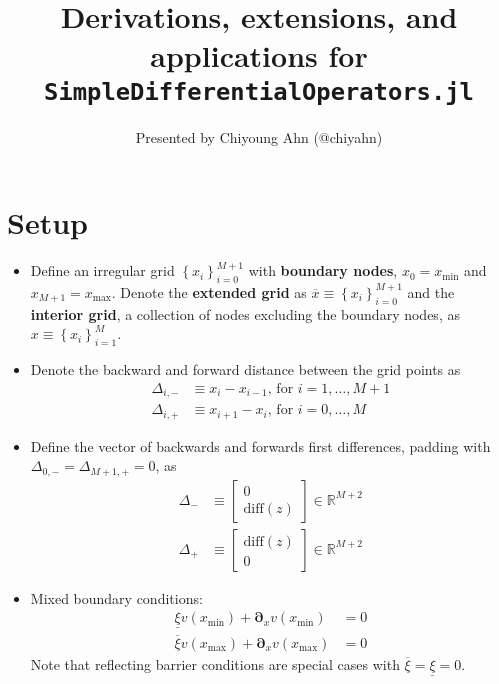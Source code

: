 \documentclass[11pt]{article}
\newcommand{\D}[1][]{\ensuremath{\boldsymbol{\partial}_{#1}}}
\newcommand{\R}{\ensuremath{\mathbb{R}}}
\newcommand{\set}[1]{\ensuremath{\left\{{#1}\right\}}}
\theoremstyle{definition}
\begin{document}
\title{Derivations, extensions, and applications for \texttt{SimpleDifferentialOperators.jl}}
\author{Presented by Chiyoung Ahn (@chiyahn)}
\maketitle

\section{Setup}

\begin{itemize}
	\item Define an irregular grid $\set{x_i}_{i=0}^{M+1}$ with \textbf{boundary nodes}, $x_0 = {x_{\min}}$ and $x_{M+1} = {x_{\max}}$. Denote the \textbf{extended grid} as $\overline{x} \equiv \set{x_i}_{i=0}^{M+1}$ and the \textbf{interior grid}, a collection of nodes excluding the boundary nodes, as $x \equiv \set{x_i}_{i=1}^{M} $.
	\item Denote the backward and forward distance between the grid points as
	\begin{align}
	\Delta_{i,-} &\equiv x_i - x_{i-1},\, \text{for } i = 1,\ldots, M+1\\
	\Delta_{i,+} &\equiv x_{i+1} - x_i,\, \text{for } i = 0,\ldots, M
	\end{align}
	\item Define the vector of backwards and forwards first differences, padding with $\Delta_{0,-} = \Delta_{M+1,+} = 0$, as
	\begin{align}
	\Delta_{-} &\equiv \begin{bmatrix} 0 \\
	\text{diff}(z)
	\end{bmatrix}\in\R^{M+2}\label{eq:Delta-minus}\\
	\Delta_{+} &\equiv \begin{bmatrix} \text{diff}(z)\\
	0
	\end{bmatrix}\in\R^{M+2}
	\end{align}
	\item Mixed boundary conditions:
	\begin{align}
	\underline{\xi} v({x_{\min}}) + \D[x]v({x_{\min}} ) &= 0\label{eq:new-BC1}\\
	\overline{\xi} v({x_{\max}}) + \D[x]v({x_{\max}}) &= 0\label{eq:new-BC2}
	\end{align}
	Note that reflecting barrier conditions are special cases with $\overline{\xi} = \underline{\xi} = 0$.
\end{itemize}
\end{document}
